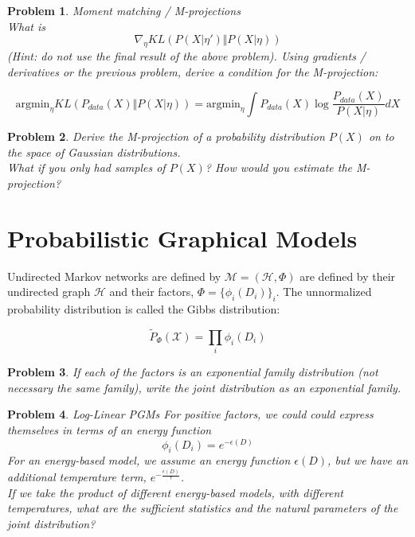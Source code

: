 \documentclass[a4paper]{article}
\newtheorem{problem}{Problem}[section]
\begin{document}
\begin{problem}
Moment matching / M-projections \\
What is 
\begin{equation}
  \nabla_\eta KL\left( P( X \vert \eta') \Vert P( X \vert \eta) \right)
  \label{}
\end{equation}
(Hint: do not use the final result of the above problem).
Using gradients / derivatives or the previous problem, derive a condition for the M-projection:

\begin{equation}
  \text{argmin}_\eta KL \left( P_{data}(X) \Vert P( X \vert \eta) \right) = \text{argmin}_\eta \int P_{data}(X) \log \frac{ P_{data}(X) }{ P( X \vert \eta) } dX
  \label{}
\end{equation}
\end{problem}

\begin{problem}
  Derive the M-projection of a probability distribution $P(X)$ on to the space of Gaussian distributions.  \\
  What if you only had samples of $P(X)$?  How would you estimate the M-projection?
\end{problem}

\section{Probabilistic Graphical Models}

Undirected Markov networks are defined by $\mathcal{M} = \left( \mathcal{H}, \Phi \right) $ are defined by their undirected graph $\mathcal{H}$ and their factors, $\Phi = \{ \phi_i(D_i) \}_i$.  
The unnormalized probability distribution is called the Gibbs distribution:

\begin{equation}
  \tilde{P}_\Phi(\mathcal{X}) = \prod_i \phi_i(D_i)
  \label{Gibbs distribution}
\end{equation}

\begin{problem}
  If each of the factors is an exponential family distribution (not necessary the same family), write the joint distribution as an exponential family.  \\
\end{problem}

\begin{problem} Log-Linear PGMs
  For positive factors, we could could express themselves in terms of an energy function
  \begin{equation}
    \phi_i(D_i) = e^{ - \epsilon(D)}
    \label{EBM}
  \end{equation}
  For an energy-based model, we assume an energy function $\epsilon(D)$, but we have an additional temperature term, $e^{-\frac{\epsilon(D)}{\tau}}$. \\
  If we take the product of different energy-based models, with different temperatures, what are the sufficient statistics and the natural parameters of the joint distribution?
\end{problem}
\end{document}
